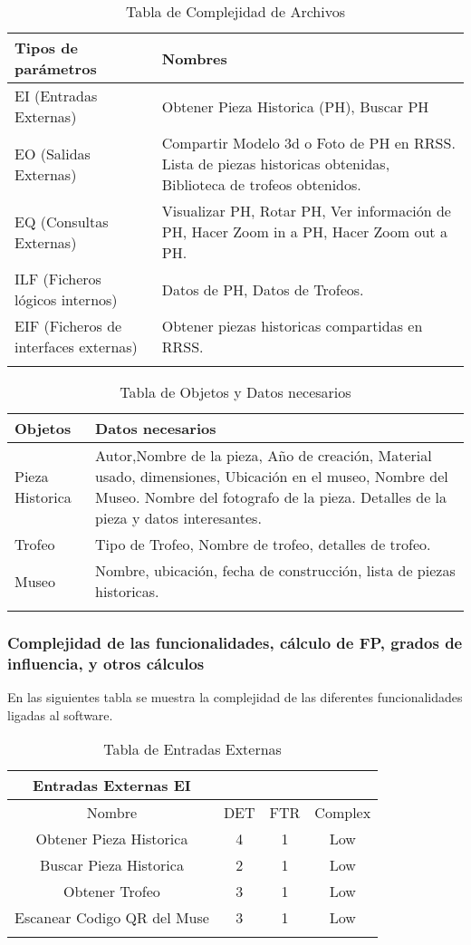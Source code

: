 \begin{longtable}{|p{5cm}|p{8cm}|}
\hline 
Tipos de parámetros & Nombres \\ 
\hline 
EI (Entradas Externas) & Obtener Pieza Historica (PH), Buscar PH \\ 
\hline 
EO (Salidas Externas) & Compartir Modelo 3d o Foto de PH en RRSS.
Lista de piezas historicas obtenidas, Biblioteca de trofeos obtenidos.
 \\ 
\hline 
EQ (Consultas Externas) & Visualizar PH, Rotar PH, Ver información de PH, Hacer Zoom in a PH, Hacer Zoom out a
PH.
 \\ 
\hline 
ILF (Ficheros lógicos internos) & Datos de PH, Datos de Trofeos. \\ 
\hline 
EIF (Ficheros de interfaces externas) & Obtener piezas historicas compartidas en
RRSS.
 \\ 
\hline 
\caption{Tabla de Complejidad de Archivos}
\label{tab2}
\end{longtable} 

\begin{longtable}{|p{5cm}|p{8cm}|}
\hline 
Objetos & Datos necesarios \\ 
\hline 
Pieza Historica & Autor,Nombre de la pieza, Año de creación, Material
usado, dimensiones, Ubicación en el museo, Nombre del
Museo. Nombre del fotografo de la pieza. Detalles de la
pieza y datos interesantes. \\ 
\hline 
Trofeo & Tipo de Trofeo, Nombre de trofeo, detalles de trofeo. \\ 
\hline 
Museo & Nombre, ubicación, fecha de construcción, lista de piezas
historicas. \\ 
\hline 
\caption{Tabla de Objetos y Datos necesarios}
\label{tab3}
\end{longtable} 

\subsubsection{Complejidad de las funcionalidades, cálculo de FP, grados de influencia, y otros cálculos}
En las siguientes tabla se muestra la complejidad de las diferentes funcionalidades ligadas al software.

\begin{longtable}{|c|c|c|c|}
\hline 
Entradas Externas EI &   &   &   \\ 
\hline 
Nombre & DET & FTR & Complex \\ 
\hline 
Obtener Pieza Historica & 4 & 1 & Low \\ 
\hline 
Buscar Pieza Historica & 2 & 1 & Low \\ 
\hline 
Obtener Trofeo & 3 & 1 & Low \\ 
\hline 
Escanear Codigo QR del Muse & 3 & 1 & Low \\ 
\hline 
\caption{Tabla de Entradas Externas}
\label{tab4}
\end{longtable}

